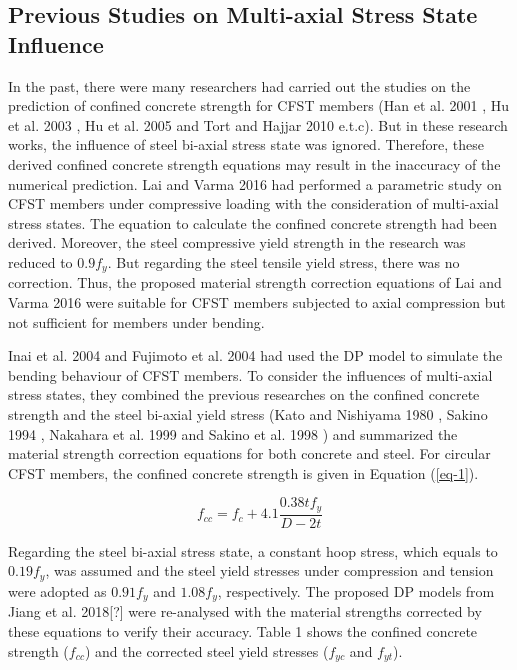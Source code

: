 \documentclass[12pt,a4]{article}
\begin{document}
	\subsection{Previous Studies on Multi-axial Stress State Influence}
	In the past, there were many researchers had carried out the studies on the prediction of confined concrete strength for CFST members (Han et al. 2001 \cite{RN23}, Hu et al. 2003 \cite{RN1}, Hu et al. 2005 \cite{RN29} and Tort and Hajjar 2010 \cite{RN46} e.t.c). But in these research works, the influence of steel bi-axial stress state was ignored. Therefore, these derived confined concrete strength equations may result in the inaccuracy of the numerical prediction. Lai and Varma 2016 \cite{RN32} had performed a parametric study on CFST members under compressive loading with the consideration of multi-axial stress states. The equation to calculate the confined concrete strength had been derived. Moreover, the steel compressive yield strength in the research was reduced to $0.9f_y$. But regarding the steel tensile yield stress, there was no correction. Thus, the proposed material strength correction equations of Lai and Varma 2016 \cite{RN32} were suitable for CFST members subjected to axial compression but not sufficient for members under bending.
	\par
	Inai et al. 2004 \cite{RN30} and Fujimoto et al. 2004 \cite{RN15} had used the DP model to simulate the bending behaviour of CFST members. To consider the influences of multi-axial stress states, they combined the previous researches on the confined concrete strength and the steel bi-axial yield stress (Kato and Nishiyama 1980 \cite{RN139}, Sakino 1994 \cite{RN138}, Nakahara et al. 1999 \cite{RN137} and Sakino et al. 1998 \cite{RN135}) and summarized the material strength correction equations for both concrete and steel. For circular CFST members, the confined concrete strength is given in Equation (\ref{eq-1}).
	\par
	\begin{equation}
	f_{cc} = f_c + 4.1 \frac{0.38tf_y}{D-2t}
	\label{eq-1}
	\end{equation}
	\par
	Regarding the steel bi-axial stress state, a constant hoop stress, which equals to $0.19f_y$, was assumed and the steel yield stresses under compression and tension were adopted as $0.91f_y$ and $1.08f_y$, respectively. The proposed DP models from Jiang et al. 2018[?] were re-analysed with the material strengths corrected by these equations to verify their accuracy. Table 1 shows the confined concrete strength ($f_{cc}$) and the corrected steel yield stresses ($f_{yc}$ and $f_{yt}$).
\end{document}
